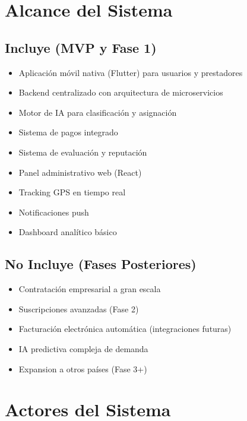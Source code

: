 \documentclass[12pt,a4paper,spanish]{article}
\begin{document}
\newpage

\section{Alcance del Sistema}

\subsection{Incluye (MVP y Fase 1)}

\begin{itemize}
    \item Aplicación móvil nativa (Flutter) para usuarios y prestadores
    \item Backend centralizado con arquitectura de microservicios
    \item Motor de IA para clasificación y asignación
    \item Sistema de pagos integrado
    \item Sistema de evaluación y reputación
    \item Panel administrativo web (React)
    \item Tracking GPS en tiempo real
    \item Notificaciones push
    \item Dashboard analítico básico
\end{itemize}

\subsection{No Incluye (Fases Posteriores)}

\begin{itemize}
    \item Contratación empresarial a gran escala
    \item Suscripciones avanzadas (Fase 2)
    \item Facturación electrónica automática (integraciones futuras)
    \item IA predictiva compleja de demanda
    \item Expansion a otros países (Fase 3+)
\end{itemize}

\newpage

\section{Actores del Sistema}
\end{document}
